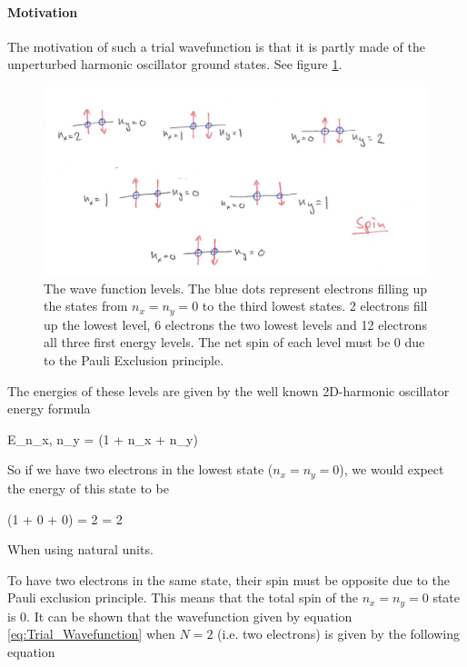 \paragraph{Motivation} \label{sec:motivation}

The motivation of such a trial wavefunction is that it is partly made of the unperturbed harmonic oscillator ground states. 
See figure \ref{fig:psi_levels}. 

\begin{figure}[h!]
	\centering 
	\includegraphics[width=\textwidth]{theory/psi_levels.jpg}
	\caption{The wave function levels. The blue dots represent electrons filling up the states from $n_x = n_y = 0$ to the third lowest states. 
	2 electrons fill up the lowest level, 6 electrons the two lowest levels and 12 electrons all three first energy levels.
	The net spin of each level must be $0$ due to the Pauli Exclusion principle. }
	\label{fig:psi_levels}
\end{figure}


The energies of these levels are given by the well known 2D-harmonic oscillator energy formula

\eqs
E_{n_x, n_y} = \hbar \omega (1 + n_x + n_y)
\eqf

So if we have two electrons in the lowest state ($n_x = n_y = 0$), we would expect the energy of this state to be 

 \cdot \hbar \omega (1 + 0 + 0) = 2 \hbar \omega = 2 \omega 
\eqf

When using natural units.

To have two electrons in the same state, their spin must be opposite due to the Pauli exclusion principle. 
This means that the total spin of the $n_x = n_y = 0$ state is $0$. 
It can be shown that the wavefunction given by equation \ref{eq:Trial_Wavefunction} when $N=2$ (i.e. two electrons) is given by the following equation

